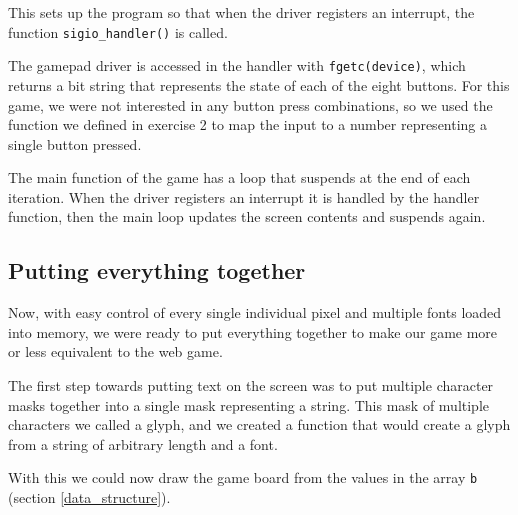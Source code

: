 

This sets up the program so that when the driver registers an interrupt, the function \texttt{sigio\_handler()} is called.


The gamepad driver is accessed in the handler with \texttt{fgetc(device)}, which returns a bit string that represents the state of each of the eight buttons.
For this game, we were not interested in any button press combinations, so we used the function we defined in exercise 2 to map the input to a number representing a single button pressed.



The main function of the game has a loop that suspends at the end of each iteration.
When the driver registers an interrupt it is handled by the handler function, then the main loop updates the screen contents and suspends again.

\newpage


\newpage


\subsection{Putting everything together}
Now, with easy control of every single individual pixel and multiple fonts loaded into memory, we were ready to put everything together to make our game more or less equivalent to the web game.

The first step towards putting text on the screen was to put multiple character masks together into a single mask representing a string.
This mask of multiple characters we called a glyph, and we created a function that would create a glyph from a string of arbitrary length and a font.



\newpage
With this we could now draw the game board from the values in the array \texttt{b} (section \ref{data_structure}).


